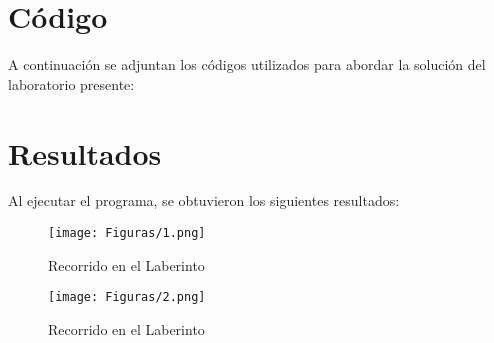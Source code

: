 \documentclass[
  letterpaper, 
  maincolor=black,
  sectioncolor=black!90,
  subsectioncolor=black!70,
  itemtextcolor=black!40,
]{fortysecondscv}
\begin{document}
\makefrontsidebar

\cvsubsection{\LARGE }
\cvsubsection{\LARGE }
\cvsubsection{\LARGE }







\newpage
\section{Código}

A continuación se adjuntan los códigos utilizados para abordar la solución del laboratorio presente: 












\section{Resultados}

Al ejecutar el programa, se obtuvieron los siguientes resultados:


\begin{figure}[H]
	\centering
	\texttt{[image: Figuras/1.png]}
	\caption{Recorrido en el Laberinto}
\end{figure}

\begin{figure}[H]
	\centering
	\texttt{[image: Figuras/2.png]}
	\caption{Recorrido en el Laberinto}
\end{figure}
\end{document}
